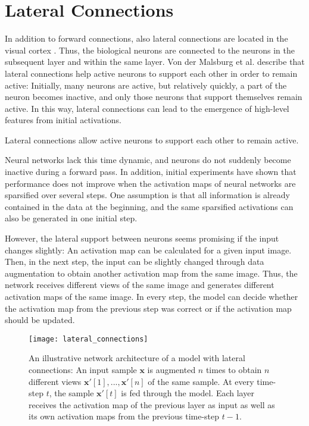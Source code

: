 \section{Lateral Connections}
In addition to forward connections, also lateral connections are located in the visual cortex .
Thus, the biological neurons are connected to the neurons in the subsequent layer and within the same layer.
Von der Malsburg et al. \cite{von_der_Malsburg_Stadelmann_Grewe_2022} describe that lateral connections help active neurons to support each other in order to remain active:
Initially, many neurons are active, but relatively quickly, a part of the neuron becomes inactive, and only those neurons that support themselves remain active. In this way, lateral connections can lead to the emergence of high-level features from initial activations.

\begin{claim}
	Lateral connections allow active neurons to support each other to remain active.
\end{claim}

Neural networks lack this time dynamic, and neurons do not suddenly become inactive during a forward pass. 
In addition, initial experiments have shown that performance does not improve when the activation maps of neural networks are sparsified over several steps.
One assumption is that all information is already contained in the data at the beginning, and the same sparsified activations can also be generated in one initial step.

However, the lateral support between neurons seems promising if the input changes slightly:
An activation map can be calculated for a given input image. Then, in the next step, the input can be slightly changed through data augmentation to obtain another activation map from the same image. Thus, the network receives different views of the same image and generates different activation maps of the same image. In every step, the model can decide whether the activation map from the previous step was correct or if the activation map should be updated.

\begin{figure}[h]
    \centering
    \texttt{[image: lateral\_connections]}
    \caption[Illustrative network architecture of a model with lateral connections]{An illustrative network architecture of a model with lateral connections: An input sample $\boldsymbol{x}$ is augmented $n$ times to obtain $n$ different views $\boldsymbol{x}'[1], ..., \boldsymbol{x}'[n]$ of the same sample. At every time-step $t$, the sample $\boldsymbol{x}'[t]$ is fed through the model. Each layer receives the activation map of the previous layer as input as well as its own activation maps from the previous time-step $t-1$.}
\end{figure}

